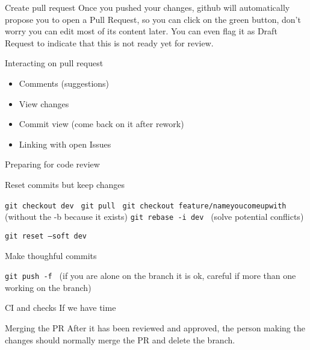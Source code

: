 \documentclass{beamer}
\begin{document}
\begin{frame}{Create pull request}
Once you pushed your changes, github will automatically propose you to open a Pull Request, so you can click on the green button, don't worry you can edit most of its content later. You can even flag it as Draft Request to indicate that this is not ready yet for review.
\end{frame}

\begin{frame}{Interacting on pull request}
\begin{itemize}
 \item Comments (suggestions)
 \item View changes
 \item Commit view (come back on it after rework)
 \item Linking with open Issues
\end{itemize}

\end{frame}

\begin{frame}{Preparing for code review}

Reset commits but keep changes

{\tt git checkout dev }
{\tt git pull }
{\tt git checkout feature/nameyoucomeupwith }(without the -b because it exists)
{\tt git rebase -i dev }
(solve potential conflicts)

{\tt git reset --soft dev } 


Make thoughful commits

{\tt git push -f } (if you are alone on the branch it is ok, careful if more than one working on the branch)

\end{frame}

\begin{frame}{CI and checks}
If we have time
\end{frame}

\begin{frame}{Merging the PR}
After it has been reviewed and approved, the person making the changes should normally merge the PR and delete the branch.

\end{frame}
\end{document}
